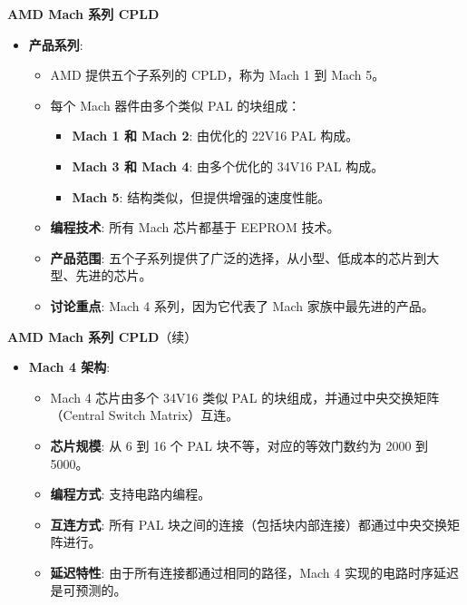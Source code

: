 \documentclass[
  ignorenonframetext,
  chinese,
]{beamer}
\providecommand{\tightlist}{%
  \setlength{\itemsep}{0pt}\setlength{\parskip}{0pt}}
\begin{document}
\begin{frame}
\begin{block}{\textbf{AMD Mach 系列 CPLD}}
\label{amd-mach-ux7cfbux5217-cpld}
\begin{itemize}
\tightlist
\item
  \textbf{产品系列}:

  \begin{itemize}
  \tightlist
  \item
    AMD 提供五个子系列的 CPLD，称为 Mach 1 到 Mach 5。
  \item
    每个 Mach 器件由多个类似 PAL 的块组成：

    \begin{itemize}
    \tightlist
    \item
      \textbf{Mach 1 和 Mach 2}: 由优化的 22V16 PAL 构成。
    \item
      \textbf{Mach 3 和 Mach 4}: 由多个优化的 34V16 PAL 构成。
    \item
      \textbf{Mach 5}: 结构类似，但提供增强的速度性能。
    \end{itemize}
  \item
    \textbf{编程技术}: 所有 Mach 芯片都基于 EEPROM 技术。
  \item
    \textbf{产品范围}:
    五个子系列提供了广泛的选择，从小型、低成本的芯片到大型、先进的芯片。
  \item
    \textbf{讨论重点}: Mach 4 系列，因为它代表了 Mach
    家族中最先进的产品。
  \end{itemize}
\end{itemize}
\end{block}
\end{frame}

\begin{frame}
\begin{block}{\textbf{AMD Mach 系列 CPLD}（续）}
\begin{itemize}
\tightlist
\item
  \textbf{Mach 4 架构}:

  \begin{itemize}
  \tightlist
  \item
    Mach 4 芯片由多个 34V16 类似 PAL
    的块组成，并通过中央交换矩阵（Central Switch Matrix）互连。
  \item
    \textbf{芯片规模}: 从 6 到 16 个 PAL 块不等，对应的等效门数约为 2000
    到 5000。
  \item
    \textbf{编程方式}: 支持电路内编程。
  \item
    \textbf{互连方式}: 所有 PAL
    块之间的连接（包括块内部连接）都通过中央交换矩阵进行。
  \item
    \textbf{延迟特性}: 由于所有连接都通过相同的路径，Mach 4
    实现的电路时序延迟是可预测的。
  \end{itemize}
\end{itemize}
\end{block}
\end{frame}
\end{document}
